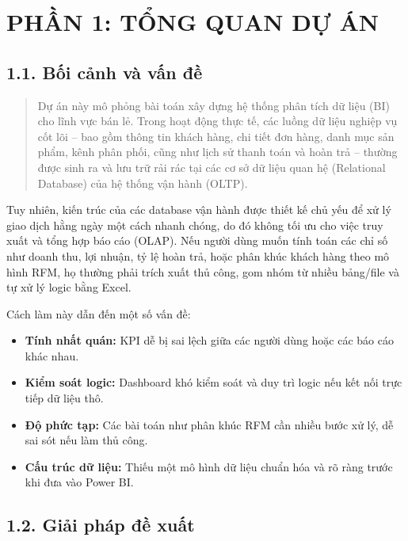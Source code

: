 \documentclass[12pt,a4paper]{article}
\begin{document}
\tableofcontents
\clearpage

\section{PHẦN 1: TỔNG QUAN DỰ ÁN}

\subsection{1.1. Bối cảnh và vấn đề}

\begin{quote}
Dự án này mô phỏng bài toán xây dựng hệ thống phân tích dữ liệu (BI) cho lĩnh vực bán lẻ. Trong hoạt động thực tế, các luồng dữ liệu nghiệp vụ cốt lõi -- bao gồm thông tin khách hàng, chi tiết đơn hàng, danh mục sản phẩm, kênh phân phối, cũng như lịch sử thanh toán và hoàn trả -- thường được sinh ra và lưu trữ rải rác tại các cơ sở dữ liệu quan hệ (Relational Database) của hệ thống vận hành (OLTP).
\end{quote}

Tuy nhiên, kiến trúc của các database vận hành được thiết kế chủ yếu để xử lý giao dịch hằng ngày một cách nhanh chóng, do đó không tối ưu cho việc truy xuất và tổng hợp báo cáo (OLAP). Nếu người dùng muốn tính toán các chỉ số như doanh thu, lợi nhuận, tỷ lệ hoàn trả, hoặc phân khúc khách hàng theo mô hình RFM, họ thường phải trích xuất thủ công, gom nhóm từ nhiều bảng/file và tự xử lý logic bằng Excel.

Cách làm này dẫn đến một số vấn đề:

\begin{itemize}
    \item \textbf{Tính nhất quán:} KPI dễ bị sai lệch giữa các người dùng hoặc các báo cáo khác nhau.
    \item \textbf{Kiểm soát logic:} Dashboard khó kiểm soát và duy trì logic nếu kết nối trực tiếp dữ liệu thô.
    \item \textbf{Độ phức tạp:} Các bài toán như phân khúc RFM cần nhiều bước xử lý, dễ sai sót nếu làm thủ công.
    \item \textbf{Cấu trúc dữ liệu:} Thiếu một mô hình dữ liệu chuẩn hóa và rõ ràng trước khi đưa vào Power BI.
\end{itemize}

\subsection{1.2. Giải pháp đề xuất}
\end{document}
